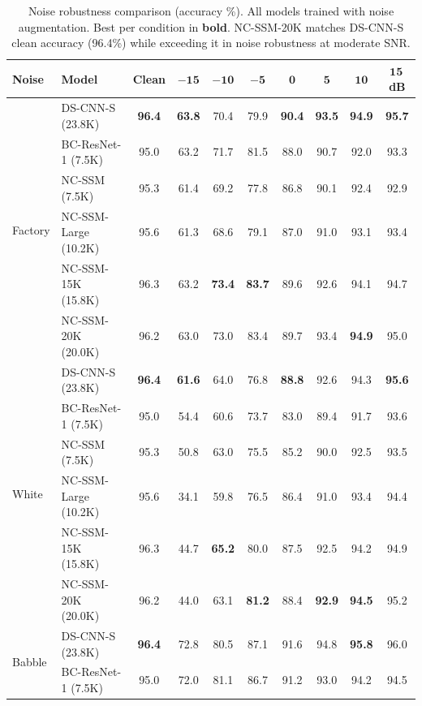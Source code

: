 \documentclass[journal]{IEEEtran}
\begin{document}
\begin{table}[t]
\centering
\caption{Noise robustness comparison (accuracy \%). All models trained with noise augmentation. Best per condition in \textbf{bold}. NC-SSM-20K matches DS-CNN-S clean accuracy (96.4\%) while exceeding it in noise robustness at moderate SNR.}
\label{tab:noise_main}
\small
\begin{tabular}{ll|cccccccc}
\toprule
\textbf{Noise} & \textbf{Model} & \textbf{Clean} & $\mathbf{-15}$ & $\mathbf{-10}$ & $\mathbf{-5}$ & $\mathbf{0}$ & $\mathbf{5}$ & $\mathbf{10}$ & $\mathbf{15}$\,\textbf{dB} \\
\midrule
\multirow{6}{*}{Factory}
  & DS-CNN-S (23.8K)       & \textbf{96.4} & \textbf{63.8} & 70.4 & 79.9 & \textbf{90.4} & \textbf{93.5} & \textbf{94.9} & \textbf{95.7} \\
  & BC-ResNet-1 (7.5K)     & 95.0 & 63.2 & 71.7 & 81.5 & 88.0 & 90.7 & 92.0 & 93.3 \\
\cmidrule{2-10}
  & NC-SSM (7.5K)          & 95.3 & 61.4 & 69.2 & 77.8 & 86.8 & 90.1 & 92.4 & 92.9 \\
  & NC-SSM-Large (10.2K)   & 95.6 & 61.3 & 68.6 & 79.1 & 87.0 & 91.0 & 93.1 & 93.4 \\
  & NC-SSM-15K (15.8K) & 96.3 & 63.2 & \textbf{73.4} & \textbf{83.7} & 89.6 & 92.6 & 94.1 & 94.7 \\
  & NC-SSM-20K (20.0K) & 96.2 & 63.0 & 73.0 & 83.4 & 89.7 & 93.4 & \textbf{94.9} & 95.0 \\
\midrule
\multirow{6}{*}{White}
  & DS-CNN-S (23.8K)       & \textbf{96.4} & \textbf{61.6} & 64.0 & 76.8 & \textbf{88.8} & 92.6 & 94.3 & \textbf{95.6} \\
  & BC-ResNet-1 (7.5K)     & 95.0 & 54.4 & 60.6 & 73.7 & 83.0 & 89.4 & 91.7 & 93.6 \\
\cmidrule{2-10}
  & NC-SSM (7.5K)          & 95.3 & 50.8 & 63.0 & 75.5 & 85.2 & 90.0 & 92.5 & 93.5 \\
  & NC-SSM-Large (10.2K)   & 95.6 & 34.1 & 59.8 & 76.5 & 86.4 & 91.0 & 93.4 & 94.4 \\
  & NC-SSM-15K (15.8K) & 96.3 & 44.7 & \textbf{65.2} & 80.0 & 87.5 & 92.5 & 94.2 & 94.9 \\
  & NC-SSM-20K (20.0K) & 96.2 & 44.0 & 63.1 & \textbf{81.2} & 88.4 & \textbf{92.9} & \textbf{94.5} & 95.2 \\
\midrule
\multirow{6}{*}{Babble}
  & DS-CNN-S (23.8K)       & \textbf{96.4} & 72.8 & 80.5 & 87.1 & 91.6 & 94.8 & \textbf{95.8} & 96.0 \\
  & BC-ResNet-1 (7.5K)     & 95.0 & 72.0 & 81.1 & 86.7 & 91.2 & 93.0 & 94.2 & 94.5 \\

\end{tabular}
\end{table}
\end{document}
